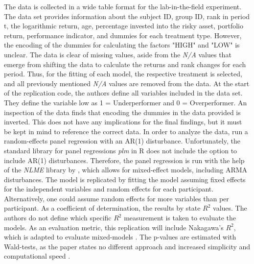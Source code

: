 \documentclass[12pt]{article}
\begin{document}
The data is collected in a wide table format for the lab-in-the-field experiment. The data set provides information about the subject ID, group ID, rank in period t, the logarithmic return, age, percentage invested into the risky asset, portfolio return, performance indicator, and dummies for each treatment type. However, the encoding of the dummies for calculating the factors "HIGH" and "LOW" is unclear. The data is clear of missing values, aside from the \textit{N/A} values that emerge from shifting the data to calculate the returns and rank changes for each period. Thus, for the fitting of each model, the respective treatment is selected, and all previously mentioned \textit{N/A} values are removed from the data. At the start of the replication code, the authors define all variables included in the data set. They define the variable low as 1 = Underperformer and 0 = Overperformer. An inspection of the data finds that encoding the dummies in the data provided is inverted. This does not have any implications for the final findings, but it must be kept in mind to reference the correct data. In order to analyze the data, \textcite{Kirchler2018} run a random-effects panel regression with an AR(1) disturbance. Unfortunately, the standard library for panel regressions \textit{plm} in R does not include the option to include AR(1) disturbances. Therefore, the panel regression is run with the help of the \textit{NLME} library by \textcite[p.~143-145]{NLME}, which allows for mixed-effect models, including ARMA disturbances. The model is replicated by fitting the model assuming fixed effects for the independent variables and random effects for each participant.  Alternatively, one could assume random effects for more variables than per participant. As a coefficient of determination, the results by \textcite[p.~2284]{Kirchler2018} state $R^{2}$ values. The authors do not define which specific $R^{2}$ measurement is taken to evaluate the models. As an evaluation metric, this replication will include Nakagawa's $R^{2}$, which is adapted to evaluate mixed-models \parencite[p.~2]{Nakagawa2017}. The p-values are estimated with Wald-tests, as the paper states no different approach and increased simplicity and computational speed \parencites[p.~91]{sjPlot}[p.~2284]{Kirchler2018}.
 \par
\end{document}
